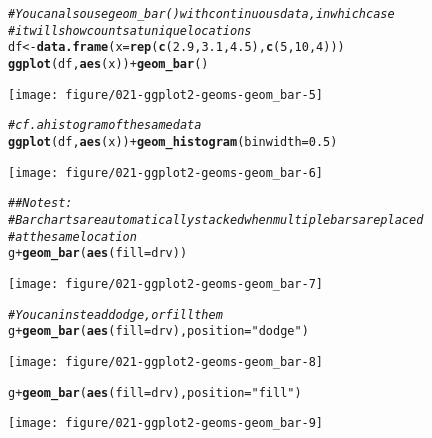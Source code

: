 \documentclass[a4paper,titlepage]{tufte-handout}\usepackage[]{graphicx}\usepackage[]{color}
\makeatletter
\def\maxwidth{ %
  \ifdim\Gin@nat@width>\linewidth
    \linewidth
  \else
    \Gin@nat@width
  \fi
}
\newcommand{\hlnum}[1]{\textcolor[rgb]{0.686,0.059,0.569}{#1}}%
\newcommand{\hlstr}[1]{\textcolor[rgb]{0.192,0.494,0.8}{#1}}%
\newcommand{\hlcom}[1]{\textcolor[rgb]{0.678,0.584,0.686}{\textit{#1}}}%
\newcommand{\hlopt}[1]{\textcolor[rgb]{0,0,0}{#1}}%
\newcommand{\hlstd}[1]{\textcolor[rgb]{0.345,0.345,0.345}{#1}}%
\newcommand{\hlkwb}[1]{\textcolor[rgb]{0.69,0.353,0.396}{#1}}%
\newcommand{\hlkwc}[1]{\textcolor[rgb]{0.333,0.667,0.333}{#1}}%
\newcommand{\hlkwd}[1]{\textcolor[rgb]{0.737,0.353,0.396}{\textbf{#1}}}%
\newenvironment{kframe}{%
 \def\at@end@of@kframe{}%
 \ifinner\ifhmode%
  \def\at@end@of@kframe{\end{minipage}}%
  \begin{minipage}{\columnwidth}%
 \fi\fi%
 \def\FrameCommand##1{\hskip\@totalleftmargin \hskip-\fboxsep
 \colorbox{shadecolor}{##1}\hskip-\fboxsep
     \hskip-\linewidth \hskip-\@totalleftmargin \hskip\columnwidth}%
 \MakeFramed {\advance\hsize-\width
   \@totalleftmargin\z@ \linewidth\hsize
   \@setminipage}}%
 {\par\unskip\endMakeFramed%
 \at@end@of@kframe}
\newenvironment{knitrout}{}{} %
\makeatother
\begin{document}
\begin{knitrout}
\begin{kframe}\begin{alltt}
\hlcom{# You can also use geom_bar() with continuous data, in which case}
\hlcom{# it will show counts at unique locations}
\hlstd{df} \hlkwb{<-} \hlkwd{data.frame}\hlstd{(}\hlkwc{x} \hlstd{=} \hlkwd{rep}\hlstd{(}\hlkwd{c}\hlstd{(}\hlnum{2.9}\hlstd{,} \hlnum{3.1}\hlstd{,} \hlnum{4.5}\hlstd{),} \hlkwd{c}\hlstd{(}\hlnum{5}\hlstd{,} \hlnum{10}\hlstd{,} \hlnum{4}\hlstd{)))}
\hlkwd{ggplot}\hlstd{(df,} \hlkwd{aes}\hlstd{(x))} \hlopt{+} \hlkwd{geom_bar}\hlstd{()}
\end{alltt}
\end{kframe}
\texttt{[image: figure/021-ggplot2-geoms-geom\_bar-5]} 
\begin{kframe}\begin{alltt}
\hlcom{# cf. a histogram of the same data}
\hlkwd{ggplot}\hlstd{(df,} \hlkwd{aes}\hlstd{(x))} \hlopt{+} \hlkwd{geom_histogram}\hlstd{(}\hlkwc{binwidth} \hlstd{=} \hlnum{0.5}\hlstd{)}
\end{alltt}
\end{kframe}
\texttt{[image: figure/021-ggplot2-geoms-geom\_bar-6]} 
\begin{kframe}\begin{alltt}
\hlcom{## No test: }
\hlcom{# Bar charts are automatically stacked when multiple bars are placed}
\hlcom{# at the same location}
\hlstd{g} \hlopt{+} \hlkwd{geom_bar}\hlstd{(}\hlkwd{aes}\hlstd{(}\hlkwc{fill} \hlstd{= drv))}
\end{alltt}
\end{kframe}
\texttt{[image: figure/021-ggplot2-geoms-geom\_bar-7]} 
\begin{kframe}\begin{alltt}
\hlcom{# You can instead dodge, or fill them}
\hlstd{g} \hlopt{+} \hlkwd{geom_bar}\hlstd{(}\hlkwd{aes}\hlstd{(}\hlkwc{fill} \hlstd{= drv),} \hlkwc{position} \hlstd{=} \hlstr{"dodge"}\hlstd{)}
\end{alltt}
\end{kframe}
\texttt{[image: figure/021-ggplot2-geoms-geom\_bar-8]} 
\begin{kframe}\begin{alltt}
\hlstd{g} \hlopt{+} \hlkwd{geom_bar}\hlstd{(}\hlkwd{aes}\hlstd{(}\hlkwc{fill} \hlstd{= drv),} \hlkwc{position} \hlstd{=} \hlstr{"fill"}\hlstd{)}
\end{alltt}
\end{kframe}
\texttt{[image: figure/021-ggplot2-geoms-geom\_bar-9]} 

\end{knitrout}
\end{document}
